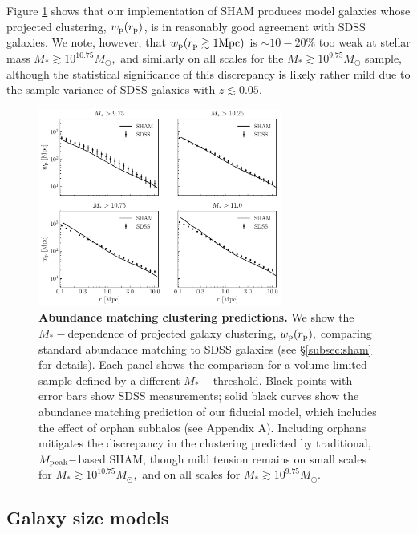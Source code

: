 \documentclass[usenatbib,usegraphicx,letterpaper]{mn2e}
\newcommand{\mstar}{M_{\ast}}
\newcommand{\mpeak}{M_{\rm peak}}
\newcommand{\rproj}{r_{\rm p}}
\newcommand{\wproj}{w_{\rm p}}
\newcommand{\msun}{M_\odot}
\begin{document}
Figure \ref{fig:baseline_sham_clustering} shows that our implementation of SHAM produces model galaxies whose projected clustering, $\wproj(\rproj)$, is in reasonably good agreement with SDSS galaxies. We note, however, that $\wproj(\rproj\gtrsim1{\rm Mpc})$ is $\sim10-20\%$ too weak at stellar mass $\mstar\gtrsim10^{10.75}\msun,$ and similarly on all scales for the $\mstar\gtrsim10^{9.75}\msun$ sample, although the statistical significance of this discrepancy is likely rather mild due to the sample variance of SDSS galaxies with $z\lesssim0.05.$

\begin{figure}
\centering
\includegraphics[width=8cm]{FIGS/baseline_sham.pdf}
\caption{
{\bf Abundance matching clustering predictions.}
We show the $\mstar-$dependence of projected galaxy clustering, $\wproj(\rproj),$ comparing standard abundance matching to SDSS galaxies (see \S\ref{subsec:sham} for details). Each panel shows the comparison for a volume-limited sample defined by a different $\mstar-$threshold. Black points with error bars show SDSS measurements; solid black curves show the abundance matching prediction of our fiducial model, which includes the effect of orphan subhalos (see Appendix A). Including orphans mitigates the discrepancy in the clustering predicted by traditional, $\mpeak-$based SHAM, though mild tension remains on small scales for $\mstar\gtrsim10^{10.75}\msun,$ and on all scales for $\mstar\gtrsim10^{9.75}\msun.$
}
\label{fig:baseline_sham_clustering}
\end{figure}

\subsection{Galaxy size models}
\label{subsec:model}
\end{document}
